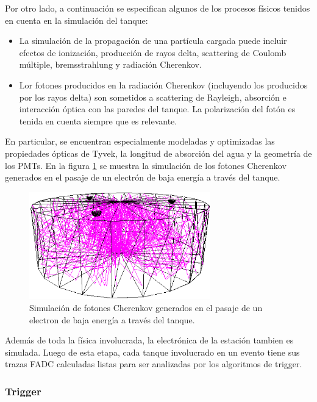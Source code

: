 		Por otro lado, a continuaci\'on se especifican algunos de los procesos f\'isicos tenidos en cuenta en la simulaci\'on del tanque:
		\begin{itemize}
		\item La simulaci\'on de la propagaci\'on de una part\'icula cargada puede incluir efectos de ionizaci\'on, producci\'on de rayos delta, scattering de Coulomb múltiple, bremsstrahlung y radiaci\'on Cherenkov.
		\item Lor fotones producidos en la radiaci\'on Cherenkov (incluyendo los producidos por los rayos delta) son sometidos a scattering de Rayleigh, absorci\'on e interacci\'on \'optica con las paredes del tanque. La polarizaci\'on del fot\'on es tenida en cuenta siempre que es relevante.
		\end{itemize}
		En particular, se encuentran especialmente modeladas y optimizadas las propiedades \'opticas de Tyvek, la longitud de absorci\'on del agua y la geometr\'ia de los PMTs.
		En la figura \ref{fig:cher_tank_sim} se muestra la simulaci\'on de los fotones Cherenkov generados en el pasaje de un electr\'on de baja energ\'ia a trav\'es del tanque.
		\begin{figure}[h!]
			\begin{center}
			\includegraphics[width=0.7\textwidth]{fig/simulacionAuger/cher_tank_sim}
			\caption{Simulaci\'on de fotones Cherenkov generados en el pasaje de un electron de baja energ\'ia a trav\'es del tanque.}
			\label{fig:cher_tank_sim}
			\end{center}
		\end{figure}
		
		Adem\'as de toda la f\'isica involucrada, la electr\'onica de la estaci\'on tambien es simulada.
		Luego de esta etapa, cada tanque involucrado en un evento tiene sus trazas FADC calculadas listas para ser analizadas por los algoritmos de trigger.
		
		\subsubsection{Trigger}
		
